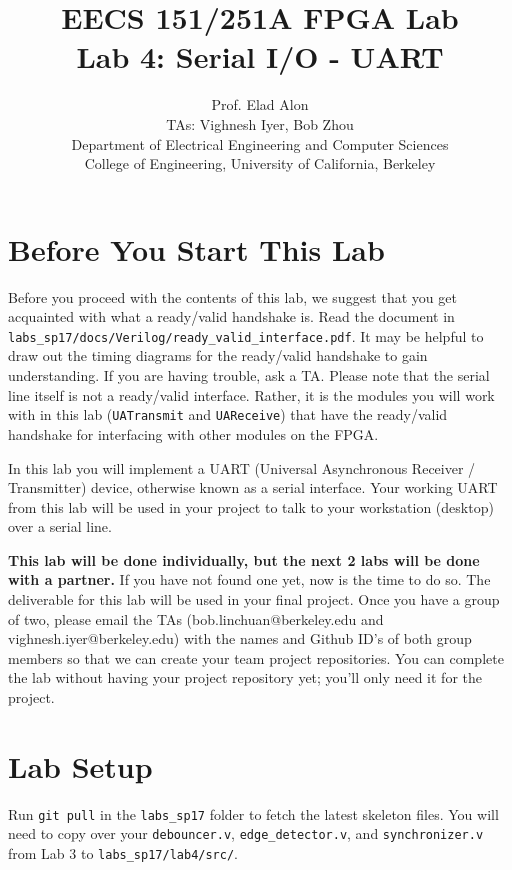 \documentclass[11pt]{article}
\begin{document}
\title{EECS 151/251A FPGA Lab\\
Lab 4: Serial I/O - UART}

\author{Prof. Elad Alon \\
TAs: Vighnesh Iyer, Bob Zhou \\
Department of Electrical Engineering and Computer Sciences\\
College of Engineering, University of California, Berkeley}
\date{}
\maketitle

\tableofcontents

\section{Before You Start This Lab}

Before you proceed with the contents of this lab, we suggest that you get acquainted with what a ready/valid handshake is. Read the document in \verb|labs_sp17/docs/Verilog/ready_valid_interface.pdf|. It may be helpful to draw out the timing diagrams for the ready/valid handshake to gain understanding. If you are having trouble, ask a TA. Please note that the serial line itself is not a ready/valid interface. Rather, it is the modules you will work with in this lab (\verb|UATransmit| and \verb|UAReceive|) that have the ready/valid handshake for interfacing with other modules on the FPGA.

In this lab you will implement a UART (Universal Asynchronous Receiver / Transmitter) device, otherwise known as a serial interface. Your working UART from this lab will be used in your project to talk to your workstation (desktop) over a serial line.

\textbf{This lab will be done individually, but the next 2 labs will be done with a partner.} If you have not found one yet, now is the time to do so. The deliverable for this lab will be used in your final project. Once you have a group of two, please email the TAs (bob.linchuan@berkeley.edu and vighnesh.iyer@berkeley.edu) with the names and Github ID's of both group members so that we can create your team project repositories. You can complete the lab without having your project repository yet; you'll only need it for the project.

\section{Lab Setup}
Run \verb|git pull| in the \verb|labs_sp17| folder to fetch the latest skeleton files. You will need to copy over your \verb|debouncer.v|, \verb|edge_detector.v|, and \verb|synchronizer.v| from Lab 3 to \verb|labs_sp17/lab4/src/|.
\end{document}
